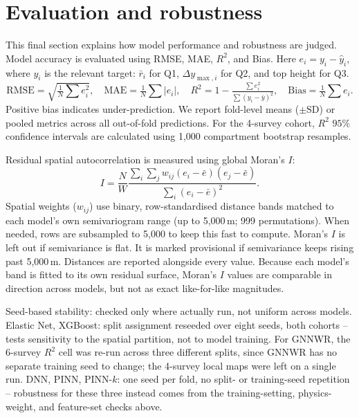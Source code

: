 \section{Evaluation and robustness} \label{sec:eval-robustness}
This final section explains how model performance and robustness are judged. Model accuracy is evaluated using RMSE, MAE, $R^2$, and Bias. Here $e_i = y_i - \hat y_i$, where $y_i$ is the relevant target: $\bar r_i$ for Q1, $\Delta y_{\max,i}$ for Q2, and top height for Q3.
\begin{equation}
\mathrm{RMSE}=\sqrt{\tfrac{1}{N}\textstyle\sum e_i^2}, \quad
\mathrm{MAE}=\tfrac{1}{N}\textstyle\sum |e_i|, \quad
R^2=1-\tfrac{\sum e_i^2}{\sum (y_i-\bar y)^2}, \quad
\mathrm{Bias}=\tfrac{1}{N}\textstyle\sum e_i.
\label{eq:eval-summary}
\end{equation}
Positive bias indicates under-prediction. We report fold-level means ($\pm\text{SD}$) or pooled metrics across all out-of-fold predictions. For the 4-survey cohort, $R^2$ $95\%$ confidence intervals are calculated using 1,000 compartment bootstrap resamples.

Residual spatial autocorrelation is measured using global Moran's $I$:
\begin{equation}
I=\frac{N}{W}\frac{\sum_i\sum_j w_{ij}(e_i-\bar e)(e_j-\bar e)}{\sum_i(e_i-\bar e)^2}.
\label{eq:morans-i}
\end{equation}
Spatial weights ($w_{ij}$) use binary, row-standardised distance bands matched to each model's own semivariogram range (up to 5,000\,m; 999 permutations). When needed, rows are subsampled to 5,000 to keep this fast to compute. Moran's $I$ is left out if semivariance is flat. It is marked provisional if semivariance keeps rising past 5,000\,m. Distances are reported alongside every value. Because each model's band is fitted to its own residual surface, Moran's $I$ values are comparable in direction across models, but not as exact like-for-like magnitudes.


Seed-based stability: checked only where actually run, not uniform across models. Elastic Net, XGBoost: split assignment reseeded over eight seeds, both cohorts -- tests sensitivity to the spatial partition, not to model training. For GNNWR, the 6-survey $R^2$ cell was re-run across three different splits, since GNNWR has no separate training seed to change; the 4-survey local maps were left on a single run. DNN, PINN, PINN-$k$: one seed per fold, no split- or training-seed repetition -- robustness for these three instead comes from the training-setting, physics-weight, and feature-set checks above.

